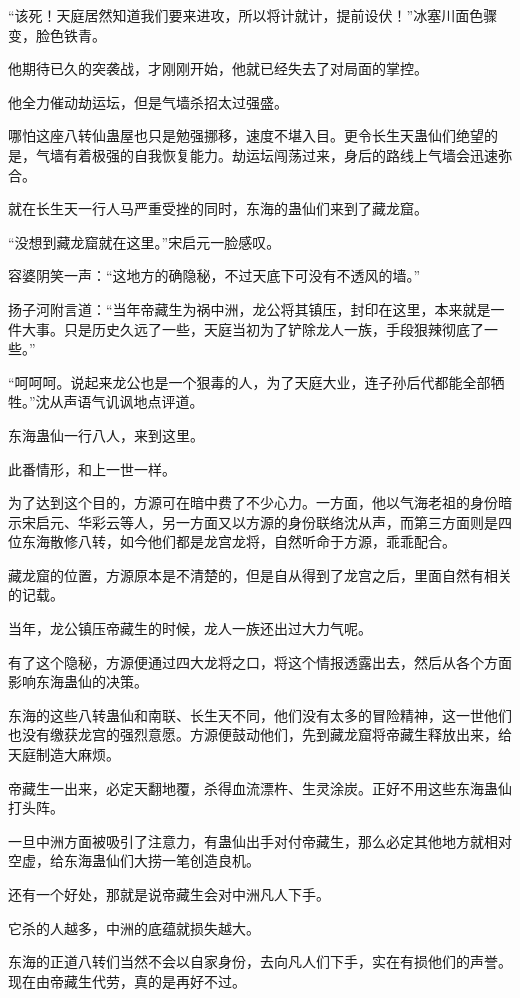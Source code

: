 \begin{this_body}
“该死！天庭居然知道我们要来进攻，所以将计就计，提前设伏！”冰塞川面色骤变，脸色铁青。

他期待已久的突袭战，才刚刚开始，他就已经失去了对局面的掌控。

他全力催动劫运坛，但是气墙杀招太过强盛。

哪怕这座八转仙蛊屋也只是勉强挪移，速度不堪入目。更令长生天蛊仙们绝望的是，气墙有着极强的自我恢复能力。劫运坛闯荡过来，身后的路线上气墙会迅速弥合。

就在长生天一行人马严重受挫的同时，东海的蛊仙们来到了藏龙窟。

“没想到藏龙窟就在这里。”宋启元一脸感叹。

容婆阴笑一声：“这地方的确隐秘，不过天底下可没有不透风的墙。”

扬子河附言道：“当年帝藏生为祸中洲，龙公将其镇压，封印在这里，本来就是一件大事。只是历史久远了一些，天庭当初为了铲除龙人一族，手段狠辣彻底了一些。”

“呵呵呵。说起来龙公也是一个狠毒的人，为了天庭大业，连子孙后代都能全部牺牲。”沈从声语气讥讽地点评道。

东海蛊仙一行八人，来到这里。

此番情形，和上一世一样。

为了达到这个目的，方源可在暗中费了不少心力。一方面，他以气海老祖的身份暗示宋启元、华彩云等人，另一方面又以方源的身份联络沈从声，而第三方面则是四位东海散修八转，如今他们都是龙宫龙将，自然听命于方源，乖乖配合。

藏龙窟的位置，方源原本是不清楚的，但是自从得到了龙宫之后，里面自然有相关的记载。

当年，龙公镇压帝藏生的时候，龙人一族还出过大力气呢。

有了这个隐秘，方源便通过四大龙将之口，将这个情报透露出去，然后从各个方面影响东海蛊仙的决策。

东海的这些八转蛊仙和南联、长生天不同，他们没有太多的冒险精神，这一世他们也没有缴获龙宫的强烈意愿。方源便鼓动他们，先到藏龙窟将帝藏生释放出来，给天庭制造大麻烦。

帝藏生一出来，必定天翻地覆，杀得血流漂杵、生灵涂炭。正好不用这些东海蛊仙打头阵。

一旦中洲方面被吸引了注意力，有蛊仙出手对付帝藏生，那么必定其他地方就相对空虚，给东海蛊仙们大捞一笔创造良机。

还有一个好处，那就是说帝藏生会对中洲凡人下手。

它杀的人越多，中洲的底蕴就损失越大。

东海的正道八转们当然不会以自家身份，去向凡人们下手，实在有损他们的声誉。现在由帝藏生代劳，真的是再好不过。


\end{this_body}
